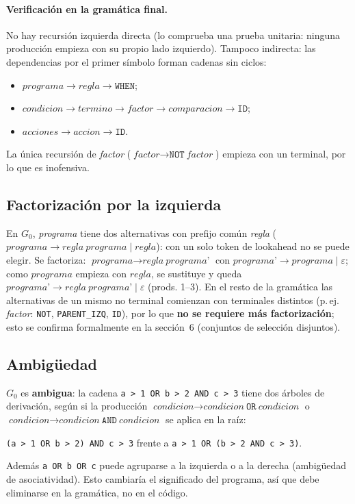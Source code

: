 \paragraph{Verificación en la gramática final.} No hay recursión izquierda directa (lo comprueba una prueba unitaria: ninguna producción
empieza con su propio lado izquierdo). Tampoco indirecta: las dependencias por el primer símbolo forman cadenas sin ciclos:
\begin{itemize}[nosep]
\item $\textit{programa}\to\textit{regla}\to\texttt{WHEN}$;
\item $\textit{condicion}\to\textit{termino}\to\textit{factor}\to\textit{comparacion}\to\texttt{ID}$;
\item $\textit{acciones}\to\textit{accion}\to\texttt{ID}$.
\end{itemize}
La única recursión de \textit{factor} ($\textit{factor}\to\texttt{NOT}\ \textit{factor}$) empieza con un terminal, por lo que es inofensiva.

\subsection{Factorización por la izquierda}
En $G_0$, \textit{programa} tiene dos alternativas con prefijo común \textit{regla}
($\textit{programa}\to\textit{regla}\ \textit{programa}\mid\textit{regla}$): con un solo token de lookahead no se
puede elegir. Se factoriza: $\textit{programa}\to\textit{regla}\ \textit{programa'}$ con
$\textit{programa'}\to\textit{programa}\mid\varepsilon$; como $\textit{programa}$ empieza con $\textit{regla}$, se
sustituye y queda $\textit{programa'}\to\textit{regla}\ \textit{programa'}\mid\varepsilon$ (prods. 1--3).
En el resto de la gramática las alternativas de un mismo no terminal comienzan con terminales distintos
(p.\,ej. \textit{factor}: \texttt{NOT}, \texttt{PARENT\_IZQ}, \texttt{ID}), por lo que \textbf{no se requiere más factorización}; esto se
confirma formalmente en la sección~6 (conjuntos de selección disjuntos).

\subsection{Ambigüedad}
$G_0$ es \textbf{ambigua}: la cadena \texttt{a > 1 OR b > 2 AND c > 3} tiene dos árboles de derivación, según si la
producción $\textit{condicion}\to\textit{condicion}\ \texttt{OR}\ \textit{condicion}$ o
$\textit{condicion}\to\textit{condicion}\ \texttt{AND}\ \textit{condicion}$ se aplica en la raíz:
\begin{center}
\texttt{(a > 1 OR b > 2) AND c > 3} \quad frente a \quad \texttt{a > 1 OR (b > 2 AND c > 3)}.
\end{center}
Además \texttt{a OR b OR c} puede agruparse a la izquierda o a la derecha (ambigüedad de asociatividad). Esto cambiaría
el significado del programa, así que debe eliminarse en la gramática, no en el código.

